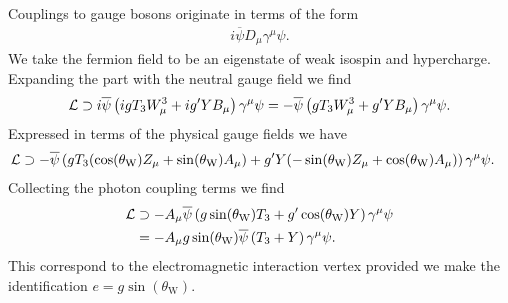 Couplings to gauge bosons originate in terms of the form
\begin{align*}
	i\overline{\psi}D_{\mu}\gamma^{\mu}\psi.
\end{align*}
We take the fermion field to be an eigenstate of weak isospin and hypercharge. Expanding the part with the neutral gauge field we find
\begin{align*}
	\mathcal{L} \supset i\overline{\psi}\left(igT_{3}W_{\mu}^{3} + ig^{\prime} YB_{\mu}\right)\gamma^{\mu}\psi = -\overline{\psi}\left(gT_{3}W_{\mu}^{3} + g^{\prime} YB_{\mu}\right)\gamma^{\mu}\psi.
\end{align*}
Expressed in terms of the physical gauge fields we have
\begin{align*}
	\mathcal{L} &\supset -\overline{\psi}\left(gT_{3}(\cos(\theta_{\text{W}})Z_{\mu} + \sin(\theta_{\text{W}})A_{\mu}) + g^{\prime} Y(-\sin(\theta_{\text{W}})Z_{\mu} + \cos(\theta_{\text{W}})A_{\mu})\right)\gamma^{\mu}\psi.
\end{align*}
Collecting the photon coupling terms we find
\begin{align*}
	\mathcal{L} &\supset -A_{\mu}\overline{\psi}\left(g\sin(\theta_{\text{W}})T_{3} + g^{\prime} \cos(\theta_{\text{W}})Y\right)\gamma^{\mu}\psi \\
	     &= -A_{\mu}g\sin(\theta_{\text{W}})\overline{\psi}\left(T_{3} + Y\right)\gamma^{\mu}\psi.
\end{align*}
This correspond to the electromagnetic interaction vertex provided we make the identification $e = g\sin(\theta_{\text{W}})$.

